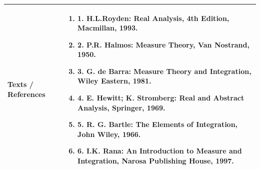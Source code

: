 \documentclass[11pt,a4paper]{article}
\begin{document}
\vspace{8pt}
\renewcommand{\arraystretch}{1.3}
\begin{tabularx}{\textwidth}{|p{3.2cm}|X|}
\hline
\textbf{Texts / References} & \begin{enumerate}[leftmargin=*,noitemsep,topsep=2pt]  \item 1. H.L.Royden: Real Analysis, 4th Edition, Macmillan, 1993.  \item 2. P.R. Halmos: Measure Theory, Van Nostrand, 1950.  \item 3. G. de Barra: Measure Theory and Integration, Wiley Eastern, 1981.  \item 4. E. Hewitt; K. Stromberg: Real and Abstract Analysis, Springer, 1969.  \item 5. R. G. Bartle: The Elements of Integration, John Wiley, 1966.  \item 6. I.K. Rana: An Introduction to Measure and Integration, Narosa Publishing House, 1997.\end{enumerate} \\
\hline
\end{tabularx}
\clearpage
\end{document}
